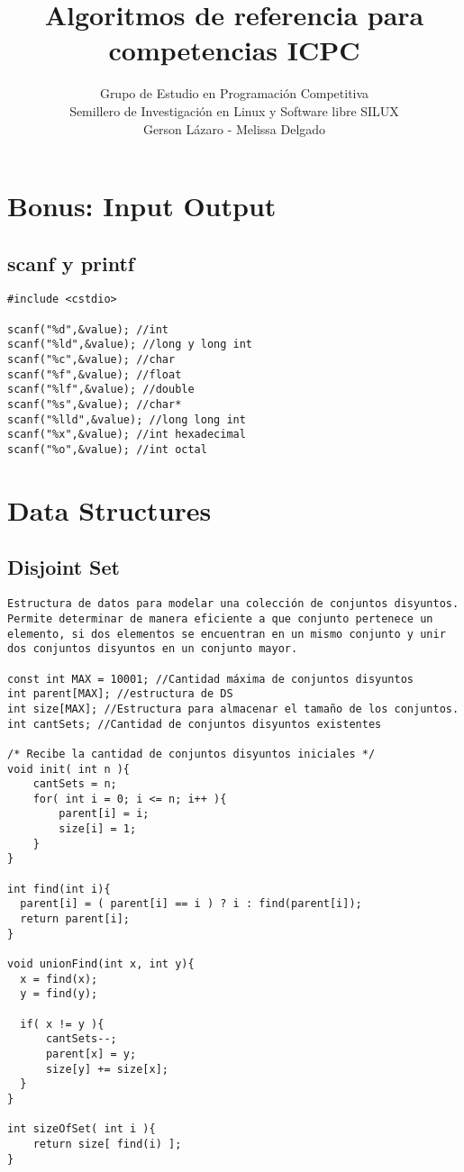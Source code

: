 \documentclass[10pt,letterpaper,twocolumn,twosided]{article}
\begin{document}
\title{Algoritmos de referencia para competencias ICPC}
\author{Grupo de Estudio en Programación Competitiva \\ Semillero de Investigación en Linux y Software libre SILUX \\ Gerson Lázaro - Melissa Delgado}
\maketitle
\tableofcontents
{}


\section{Bonus: Input Output}

\subsection{scanf y printf}
\begin{lstlisting}
#include <cstdio>

scanf("%d",&value); //int
scanf("%ld",&value); //long y long int
scanf("%c",&value); //char 
scanf("%f",&value); //float
scanf("%lf",&value); //double
scanf("%s",&value); //char*
scanf("%lld",&value); //long long int
scanf("%x",&value); //int hexadecimal
scanf("%o",&value); //int octal
\end{lstlisting}

\section{Data Structures}

\subsection{Disjoint Set}
\begin{lstlisting}
Estructura de datos para modelar una colección de conjuntos disyuntos. Permite determinar de manera eficiente a que conjunto pertenece un elemento, si dos elementos se encuentran en un mismo conjunto y unir dos conjuntos disyuntos en un conjunto mayor.

const int MAX = 10001; //Cantidad máxima de conjuntos disyuntos
int parent[MAX]; //estructura de DS
int size[MAX]; //Estructura para almacenar el tamaño de los conjuntos.
int cantSets; //Cantidad de conjuntos disyuntos existentes

/* Recibe la cantidad de conjuntos disyuntos iniciales */
void init( int n ){
    cantSets = n;
    for( int i = 0; i <= n; i++ ){
        parent[i] = i;
        size[i] = 1;
    }
}

int find(int i){
  parent[i] = ( parent[i] == i ) ? i : find(parent[i]);
  return parent[i];
}

void unionFind(int x, int y){
  x = find(x);
  y = find(y);

  if( x != y ){
      cantSets--;
      parent[x] = y;
      size[y] += size[x];
  }
}

int sizeOfSet( int i ){
    return size[ find(i) ];
}\end{lstlisting}
\end{document}
